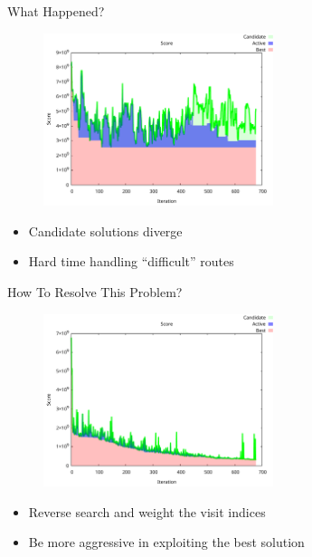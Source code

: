 \documentclass[bigger]{beamer}
\begin{document}
\begin{frame}[label={sec:orgd565965}]{What Happened?}
\begin{figure}[htpb]
\centering
    \includegraphics[width=0.6\textwidth]{img/score-diverge}
\end{figure}

\begin{itemize}
\item Candidate solutions diverge
\item Hard time handling ``difficult'' routes
\end{itemize}
\end{frame}
\begin{frame}[label={sec:org3be825f}]{How To Resolve This Problem?}
\begin{figure}[htpb]
\centering
    \includegraphics[width=0.6\textwidth]{img/score-convergence}
\end{figure}

\begin{itemize}
\item Reverse search and weight the visit indices
\item Be more aggressive in exploiting the best solution
\end{itemize}
\end{frame}
\end{document}
